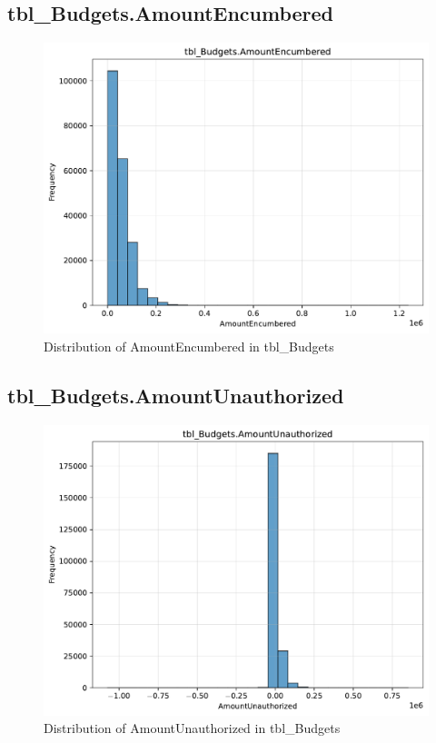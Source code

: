 \subsection{tbl\_Budgets.AmountEncumbered}

\begin{figure}[htbp]
\centering
\includegraphics[width=\textwidth]{figures/dbo_tbl_Budgets_AmountEncumbered.pdf}
\caption{Distribution of AmountEncumbered in tbl\_Budgets}
\end{figure}\newpage

\subsection{tbl\_Budgets.AmountUnauthorized}

\begin{figure}[htbp]
\centering
\includegraphics[width=\textwidth]{figures/dbo_tbl_Budgets_AmountUnauthorized.pdf}
\caption{Distribution of AmountUnauthorized in tbl\_Budgets}
\end{figure}\newpage

